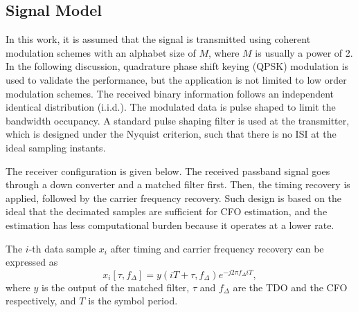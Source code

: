\documentclass[12pt, draftclsnofoot, onecolumn]{IEEEtran}
\begin{document}
\subsection{Signal Model }  
\label{sec:model}

In this work, it is assumed that the signal is transmitted using coherent modulation schemes with an alphabet size of \(M\), where \(M\) is usually a power of 2.
In the following discussion, quadrature phase shift keying (QPSK) modulation is used to validate the performance, but the application is not limited to low order modulation schemes.
The received binary information follows an independent identical distribution (i.i.d.).
The modulated data is pulse shaped to limit the bandwidth occupancy.
A standard pulse shaping filter is used at the transmitter, which is designed under the Nyquist criterion, 
such that there is no ISI at the ideal sampling instants.


The receiver configuration is given below.
The received passband signal goes through a down converter and a matched filter first.
Then, the timing recovery is applied, followed by the carrier frequency recovery.
Such design is based on the ideal that the decimated samples are sufficient for CFO estimation, and the estimation has less computational burden because it operates at a lower rate.

The $i$-th data sample \(x_i\) after timing and carrier frequency recovery can be expressed as \cite{Xie2012ExactOFDM}
\begin{equation}
{x_i}[\tau, f_\Delta ] = y(iT +  \tau, f_\Delta){e^{ - j2\pi {f_\Delta }iT}},
\end{equation}
% 
% 
where \(y\) is the output of the matched filter, \(\tau\) and \(f_\Delta\) are the TDO and the CFO respectively, and \(T\) is the symbol period.
\end{document}
